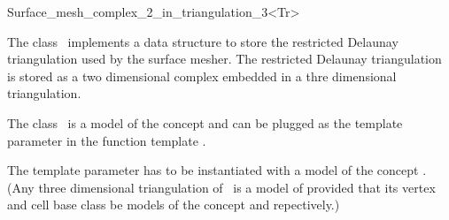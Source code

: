 

\begin{ccRefClass}{Surface_mesh_complex_2_in_triangulation_3<Tr>}  %


\ccDefinition
  
The class \ccRefName\  implements a data structure to store
the restricted Delaunay triangulation used by the surface mesher.
The restricted Delaunay triangulation is stored as a two dimensional
complex embedded in a thre dimensional triangulation.


The class  \ccRefName\ is a model of the concept 
and can be plugged as the template parameter 
in the function template .


The template parameter  has to be instantiated
with a model of the concept .
(Any three dimensional   triangulation of
\cgal\ is a model of 
provided that its vertex and cell base class be models
of the concept  and
repectively.)





\ccIsModel












\end{ccRefClass}
